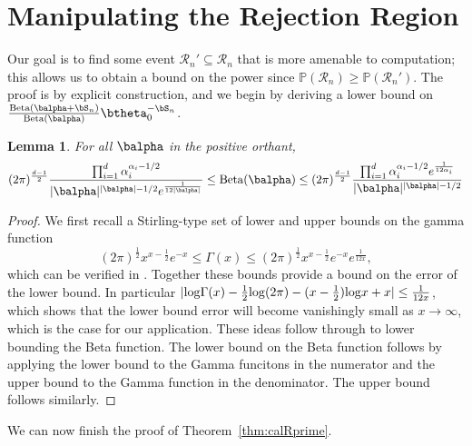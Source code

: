 \documentclass[11pt]{article}
\def\log{{\rm log}}
\newcommand{\Beta}{\mathrm{Beta}}
\newtheorem{lemma}{Lemma}[section]
\begin{document}
\section{Manipulating the Rejection Region}
\label{sec:rejection_region}
Our goal is to find some event $\mathcal R_n'\subseteq \mathcal R_n$ that is more amenable to computation; this allows us to obtain a bound on the power since
$\mathbb{P}(\mathcal R_n) \geq \mathbb{P}(\mathcal R_n')$.
The proof is by explicit construction, and we begin by deriving a lower bound on 
$
 \frac{\Beta(\balpha + \bS_n)} {\Beta(\balpha)} \btheta_0 ^{-\bS_n}
$.
\begin{lemma}\label{lem:beta.lower.bound}
  For all $\balpha$ in the positive orthant,
  \begin{equation*}
    (2\pi)^{\frac{d-1}{2}}
    \frac{\prod_{i=1}^d \alpha_i^{\alpha_i - 1/2}}{|\balpha|^{|\balpha|-1/2}e^{\frac{1}{12|\balpha|}}} \leq  \Beta(\balpha) \leq 
(2\pi)^{\frac{d-1}{2}}
    \frac{\prod_{i=1}^d \alpha_i^{\alpha_i - 1/2}e^{\frac{1}{12\alpha_i}}}{|\balpha|^{|\balpha|-1/2}} 
  \end{equation*}
\end{lemma}
\begin{proof}
  We first recall a Stirling-type set of lower and upper bounds on the gamma function
\begin{equation}
(2\pi)^{\frac{1}{2}}x^{x-\frac{1}{2}}e^{-x}
  \leq \Gamma(x) \leq (2\pi)^{\frac{1}{2}}x^{x-\frac{1}{2}}e^{-x}e^{\frac{1}{12x}},
\end{equation}
which can be verified in \cite{specialfunctions}.
Together these bounds provide a bound on the error of the lower bound.
In particular $|\log \Gamma(x) - \frac{1}{2}\log (2\pi) - (x-\frac{1}{2})\log x + x| \leq \frac{1}{12x}$, which shows
that the lower bound error will become vanishingly small as $x\rightarrow \infty$, which is the case for our application. 
These ideas follow through to lower bounding the Beta function. The lower bound on the Beta function follows by applying the lower bound to the Gamma funcitons
in the numerator and the upper bound to the Gamma function in the denominator. The upper bound follows similarly.
\end{proof}
\noindent We can now finish the proof of Theorem~\ref{thm:calRprime}.
\end{document}
